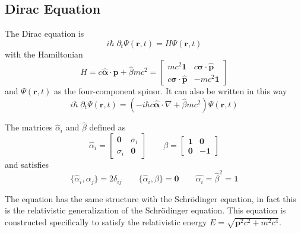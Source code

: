 \documentclass[../../../main.tex]{subfiles}
\begin{document}
\subsection{Dirac Equation}
The Dirac equation is
\begin{equation*}
    i \hbar \; \partial_t \Psi(\mathbf{r },t) = H \Psi(\mathbf{r },t)
\end{equation*}
with the Hamiltonian
\begin{equation*}
    H = c \hat{\boldsymbol{\alpha}} \cdot \mathbf{p} + \hat{\beta}mc^2
    = \begin{bmatrix}
        m c^{2} \mathbf{1}                        & c \boldsymbol{\sigma}\cdot\hat{\mathbf{p}} \\
        c\boldsymbol{\sigma}\cdot\hat{\mathbf{p}} & -m c^{2} \mathbf{1}
    \end{bmatrix}
\end{equation*}
and $\Psi(\mathbf{r },t)$ as the four-component spinor.
It can also be written in this way
\begin{equation*}
    i\hbar \;\partial_t \Psi(\mathbf{r},t)=\left(-i\hbar c\hat{\boldsymbol{\alpha}}\cdot\nabla + \hat{\beta}m c^{2}\right)\Psi(\mathbf{r},t)
\end{equation*}

The matrices $\hat{\alpha}_i$ and $\hat{\beta}$ defined as
\begin{equation*}
    {\hat{\alpha}}_i = \begin{bmatrix} \mathbf{0} & {\sigma}_i\\  {\sigma}_i & \mathbf{0} \end{bmatrix}\qquad
    \beta = \begin{bmatrix} \mathbf{1} & \mathbf{0}\\ \mathbf{0} & -\mathbf{1} \end{bmatrix}
\end{equation*}
and satisfies
\begin{equation*}
    \{\hat{\alpha}_i,\alpha_j\}=2\delta_{ij} \qquad
    \{\hat{\alpha}_i,\beta\}=\mathbf{0} \qquad
    \hat{\alpha_i}=\hat{\beta}^2=\mathbf{1}
\end{equation*}

The equation has the same structure with the Schrödinger equation, in fact this is the relativistic generalization of the Schrödinger equation.
This equation is constructed specifically to satisfy the relativistic energy $E= \sqrt{\mathbf{p }^2c^2+m^2c^4}$.
\end{document}
